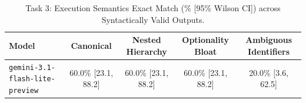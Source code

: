 \begin{table}[t]
\centering
\small
\caption{Task 3: Execution Semantics Exact Match (\% [95\% Wilson CI]) across Syntactically Valid Outputs.}
\label{tab:task3_semantics}
\begin{tabular}{lcccc}
\toprule
\textbf{Model} & \textbf{Canonical} & \textbf{Nested Hierarchy} & \textbf{Optionality Bloat} & \textbf{Ambiguous Identifiers} \\
\midrule
\texttt{gemini-3.1-flash-lite-preview} & 60.0\% [23.1, 88.2] & 60.0\% [23.1, 88.2] & 60.0\% [23.1, 88.2] & 20.0\% [3.6, 62.5] \\
\bottomrule
\end{tabular}
\end{table}